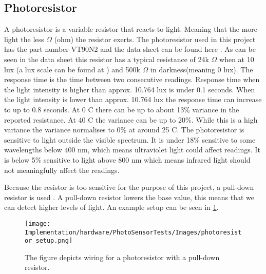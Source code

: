 \subsection{Photoresistor}
A photoresistor is a variable resistor that reacts to light. Meaning that the more light the less $\Omega$ (ohm) the resistor exerts. The photoresistor used in this project has the part number VT90N2 and the data sheet can be found here \cite{photoresistor_sheet}. As can be seen in the data sheet this resistor has a typical resistance of 24k $\Omega$ when at 10 lux (a lux scale can be found at \cite{lux_scale}) and 500k $\Omega$ in darkness(meaning 0 lux). The response time is the time between two consecutive readings. Response time when the light intensity is higher than approx. 10.764 lux is under 0.1 seconds. When the light intensity is lower than approx. 10.764 lux the response time can increase to up to 0.8 seconds. At 0 \degree C there can be up to about 13\% variance in the reported resistance. At 40 \degree C the variance can be up to 20\%. While this is a high variance the variance normalises to 0\% at around 25 \degree C. The photoresistor is sensitive to light outside the visible spectrum. It is under 18\% sensitive to some wavelengths below 400 nm, which means ultraviolet light could affect readings. It is below 5\% sensitive to light above 800 nm which means infrared light should not meaningfully affect the readings.

Because the resistor is too sensitive for the purpose of this project, a pull-down resistor is used \cite{pulldown_resistor}. A pull-down resistor lowers the base value, this means that we can detect higher levels of light. An example setup can be seen in \cref{fig:arduino_photoresistor_wiring}.

\begin{figure}[htbp]
  \centering
  \texttt{[image: Implementation/hardware/PhotoSensorTests/Images/photoresistor\_setup.png]}
  \caption{The figure depicts wiring for a photoresistor with a pull-down resistor.}\label{fig:arduino_photoresistor_wiring}
\end{figure}

